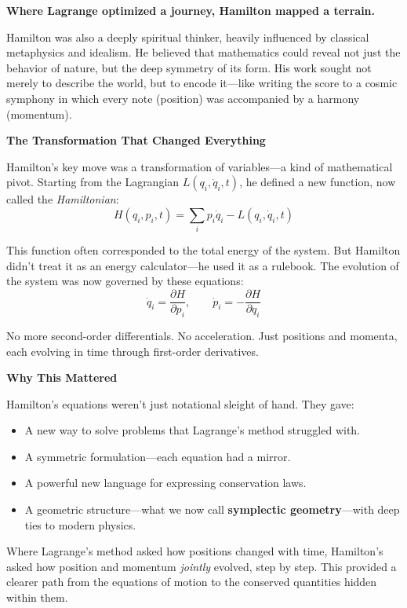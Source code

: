 \textbf{Where Lagrange optimized a journey, Hamilton mapped a terrain.}

Hamilton was also a deeply spiritual thinker, heavily influenced by classical metaphysics and idealism. He believed that mathematics could reveal not just the behavior of nature, but the deep symmetry of its form. His work sought not merely to describe the world, but to encode it—like writing the score to a cosmic symphony in which every note (position) was accompanied by a harmony (momentum).

\vspace{1em}
\textbf{The Transformation That Changed Everything}

Hamilton’s key move was a transformation of variables—a kind of mathematical pivot. Starting from the Lagrangian \( L(q_i, \dot{q}_i, t) \), he defined a new function, now called the \emph{Hamiltonian}:
\[
H(q_i, p_i, t) = \sum_i p_i \dot{q}_i - L(q_i, \dot{q}_i, t)
\]

This function often corresponded to the total energy of the system. But Hamilton didn’t treat it as an energy calculator—he used it as a rulebook. The evolution of the system was now governed by these equations:
\[
\dot{q}_i = \frac{\partial H}{\partial p_i}, \qquad \dot{p}_i = -\frac{\partial H}{\partial q_i}
\]

No more second-order differentials. No acceleration. Just positions and momenta, each evolving in time through first-order derivatives.

\vspace{1em}
\textbf{Why This Mattered}

Hamilton’s equations weren’t just notational sleight of hand. They gave:

\begin{itemize}
    \item A new way to solve problems that Lagrange’s method struggled with.
    \item A symmetric formulation—each equation had a mirror.
    \item A powerful new language for expressing conservation laws.
    \item A geometric structure—what we now call \textbf{symplectic geometry}—with deep ties to modern physics.
\end{itemize}

Where Lagrange’s method asked how positions changed with time, Hamilton’s asked how position and momentum \emph{jointly} evolved, step by step. This provided a clearer path from the equations of motion to the conserved quantities hidden within them.

